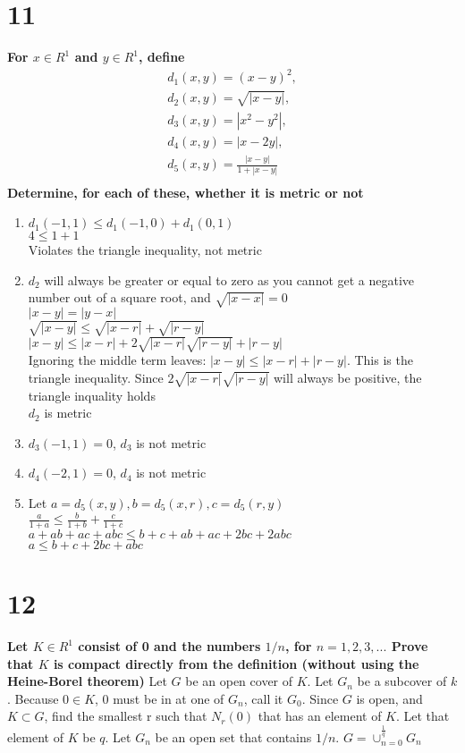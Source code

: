 \documentclass{article}
\begin{document}
\section*{11}
\noindent \textbf{For $x \in R^1$ and $y \in R^1$, define}
\begin{align*}
    d_1(x,y) = (x-y)^2,\\
    d_2(x,y) = \sqrt{|x-y|},\\
    d_3(x,y) = |x^2 - y^2|,\\
    d_4(x,y) = |x - 2y|,\\
    d_5(x,y) = \frac{|x-y|}{1 + |x-y|}\\
\end{align*}
\textbf{Determine, for each of these, whether it is metric or not}
\begin{center}

\begin{enumerate}
    \item $d_1(-1,1) \le d_1(-1,0) + d_1(0,1)$ \\ $4 \le 1 + 1$ \\ Violates the triangle inequality, not metric
    \item $d_2$ will always be greater or equal to zero as you cannot get a negative number out of a square root, and $\sqrt{|x-x|} = 0$\\ $|x - y| = |y - x|$\\ $\sqrt{|x-y|} \le \sqrt{|x-r|} + \sqrt{|r-y|}$ \\ $|x-y| \le |x-r| + 2\sqrt{|x-r|} \sqrt{|r-y|} + |r-y|$ \\ Ignoring the middle term leaves: $|x-y| \le |x-r| + |r-y|$. This is the triangle inequality. Since $2\sqrt{|x-r|} \sqrt{|r-y|}$ will always be positive, the triangle inquality holds \\ $d_2$ is metric
    \item $d_3(-1,1) = 0$, $d_3$ is not metric
    \item $d_4(-2,1) = 0$, $d_4$ is not metric
    \item Let $a = d_5(x,y), b = d_5(x,r), c = d_5(r,y)$ \\ $\frac{a}{1+a} \le \frac{b}{1+b} + \frac{c}{1+c}$\\ $a + ab +ac + abc \le b + c+ ab + ac + 2bc + 2abc$\\ $a \le b + c + 2bc + abc$
\end{enumerate}
\end{center}

\section*{12}
\noindent \textbf{Let $K \in R^1$ consist of 0 and the numbers $1/n$, for $n = 1,2,3,...$ Prove that $K$ is compact directly from the definition (without using the Heine-Borel theorem)}
Let $G$ be an open cover of $K$. Let $G_n$ be a subcover of $k$. Because $0 \in K$, 0 must be in at one of $G_n$, call it $G_0$. Since $G$ is open, and $K \subset G$, find the smallest r such that $N_r(0)$ that has an element of $K$. Let that element of $K$ be $q$. 
Let $G_n$ be an open set that contains $1/n$. $G = \mathop{\cup}^{\frac{1}{q}}_{n = 0} G_n $\\
\end{document}

